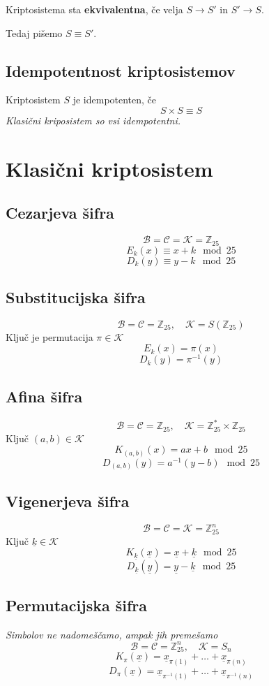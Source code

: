 \begin{multicols}{5}
Kriptosistema sta \textbf{ekvivalentna}, če velja $S \to S'$ in $S' \to S$.

Tedaj pišemo $S \equiv S'$.

\subsection*{Idempotentnost kriptosistemov}
Kriptosistem $S$ je idempotenten, če
\[ S \times S \equiv S\]
\textit{Klasični kriposistem so vsi idempotentni.}

\section*{Klasični kriptosistem}
\subsection*{Cezarjeva šifra}
\[ \mathcal{B} = \mathcal{C} = \mathcal{K} = \mathbb{Z}_{25}\]
\[ E_k(x) \equiv x + k \mod 25\]
\[ D_k(y) \equiv y - k \mod 25\]

\subsection*{Substitucijska šifra}
\[ \mathcal{B} = \mathcal{C} = \mathbb{Z}_{25}, \quad \mathcal{K} = S(\mathbb{Z}_{25})\]
Ključ je permutacija $\pi \in \mathcal{K}$
\[ E_k(x) = \pi(x) \]
\[ D_k(y) = \pi^{-1}(y) \]

\subsection*{Afina šifra}
\[ \mathcal{B} = \mathcal{C} = \mathbb{Z}_{25}, \quad \mathcal{K} = \mathbb{Z}_{25}^{*} \times \mathbb{Z}_{25} \]
Ključ $(a, b) \in \mathcal{K}$
\[ K_{(a,b)}(x) = ax + b \mod 25\]
\[ D_{(a,b)}(y) = a^{-1}(y - b) \mod 25\]

\subsection*{Vigenerjeva šifra}
\[ \mathcal{B} = \mathcal{C} = \mathcal{K} = \mathbb{Z}_{25}^n\]
Ključ $\underline{k} \in \mathcal{K}$
\[ K_{\underline{k}}(\underline{x}) = \underline{x} + \underline{k} \mod 25\]
\[ D_{\underline{k}}(\underline{y}) = \underline{y} - \underline{k} \mod 25\]

\subsection*{Permutacijska šifra}
\textit{Simbolov ne nadomeščamo, ampak jih premešamo}
\[ \mathcal{B} = \mathcal{C} = \mathbb{Z}_{25}^n, \quad \mathcal{K} = S_n\]
\[ K_{\pi}(\underline{x}) = \underline{x}_{\pi(1)} + \dots + \underline{x}_{\pi(n)}  \]
\[ D_{\pi}(\underline{x}) = \underline{x}_{\pi^{-1}(1)} + \dots + \underline{x}_{\pi^{-1}(n)}  \]


\end{multicols}
